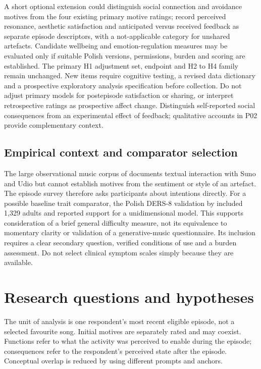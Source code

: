 \documentclass[11pt,a4paper]{article}
\begin{document}
A short optional extension could distinguish social connection and avoidance motives from the four existing primary motive ratings; record perceived resonance, aesthetic satisfaction and anticipated versus received feedback as separate episode descriptors, with a not-applicable category for unshared artefacts. Candidate wellbeing and emotion-regulation measures may be evaluated only if suitable Polish versions, permissions, burden and scoring are established. The primary H1 adjustment set, endpoint and H2 to H4 family remain unchanged. New items require cognitive testing, a revised data dictionary and a prospective exploratory analysis specification before collection. Do not adjust primary models for postepisode satisfaction or sharing, or interpret retrospective ratings as prospective affect change. Distinguish self-reported social consequences from an experimental effect of feedback; qualitative accounts in P02 provide complementary context.

\subsection{Empirical context and comparator selection}
The large observational music corpus of \citet{casini2026} documents textual interaction with Suno and Udio but cannot establish motives from the sentiment or style of an artefact. The episode survey therefore asks participants about intentions directly. For a possible baseline trait comparator, the Polish DERS-8 validation by \citet{larionowders2025} included 1,329 adults and reported support for a unidimensional model. This supports consideration of a brief general difficulty measure, not its equivalence to momentary clarity or validation of a generative-music questionnaire. Its inclusion requires a clear secondary question, verified conditions of use and a burden assessment. Do not select clinical symptom scales simply because they are available.

\section{Research questions and hypotheses}
The unit of analysis is one respondent's most recent eligible episode, not a selected favourite song. Initial motives are separately rated and may coexist. Functions refer to what the activity was perceived to enable during the episode; consequences refer to the respondent's perceived state after the episode. Conceptual overlap is reduced by using different prompts and anchors.
\end{document}
